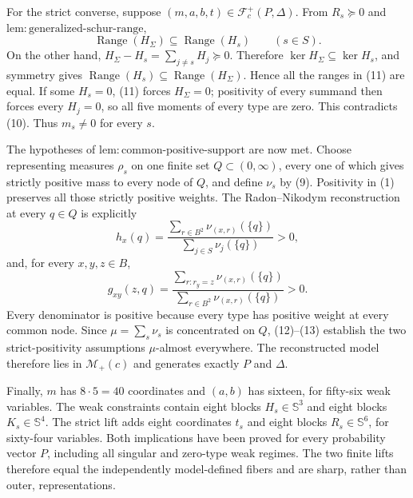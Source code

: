 For the strict converse, suppose \((m,a,b,t)\in\mathcal F_c^+(P,\Delta)\).  From \(R_s\succeq0\) and \(\mathrm{lem{:}generalized\text{-}schur\text{-}range}\),
\[
 \operatorname{Range}(H_\Sigma)\subseteq\operatorname{Range}(H_s)
 \qquad(s\in S). \tag{11}
\]
On the other hand, \(H_\Sigma-H_s=\sum_{j\ne s}H_j\succeq0\).  Therefore \(\ker H_\Sigma\subseteq\ker H_s\), and symmetry gives \(\operatorname{Range}(H_s)\subseteq\operatorname{Range}(H_\Sigma)\).  Hence all the ranges in (11) are equal.  If some \(H_s=0\), (11) forces \(H_\Sigma=0\); positivity of every summand then forces every \(H_j=0\), so all five moments of every type are zero.  This contradicts (10).  Thus \(m_s\ne0\) for every \(s\).

The hypotheses of \(\mathrm{lem{:}common\text{-}positive\text{-}support}\) are now met.  Choose representing measures \(\rho_s\) on one finite set \(Q\subset(0,\infty)\), every one of which gives strictly positive mass to every node of \(Q\), and define \(\nu_s\) by (9).  Positivity in (1) preserves all those strictly positive weights.  The Radon--Nikodym reconstruction at every \(q\in Q\) is explicitly
\[
 h_x(q)=
 \frac{\sum_{r\in B^2}\nu_{(x,r)}(\{q\})}
      {\sum_{j\in S}\nu_j(\{q\})}>0, \tag{12}
\]
and, for every \(x,y,z\in B\),
\[
 g_{xy}(z,q)=
 \frac{\sum_{r:r_y=z}\nu_{(x,r)}(\{q\})}
      {\sum_{r\in B^2}\nu_{(x,r)}(\{q\})}>0. \tag{13}
\]
Every denominator is positive because every type has positive weight at every common node.  Since \(\mu=\sum_s\nu_s\) is concentrated on \(Q\), (12)--(13) establish the two strict-positivity assumptions \(\mu\)-almost everywhere.  The reconstructed model therefore lies in \(\mathcal M_+(c)\) and generates exactly \(P\) and \(\Delta\).

Finally, \(m\) has \(8\cdot5=40\) coordinates and \((a,b)\) has sixteen, for fifty-six weak variables.  The weak constraints contain eight blocks \(H_s\in\mathbb S^3\) and eight blocks \(K_s\in\mathbb S^4\).  The strict lift adds eight coordinates \(t_s\) and eight blocks \(R_s\in\mathbb S^6\), for sixty-four variables.  Both implications have been proved for every probability vector \(P\), including all singular and zero-type weak regimes.  The two finite lifts therefore equal the independently model-defined fibers and are sharp, rather than outer, representations.

